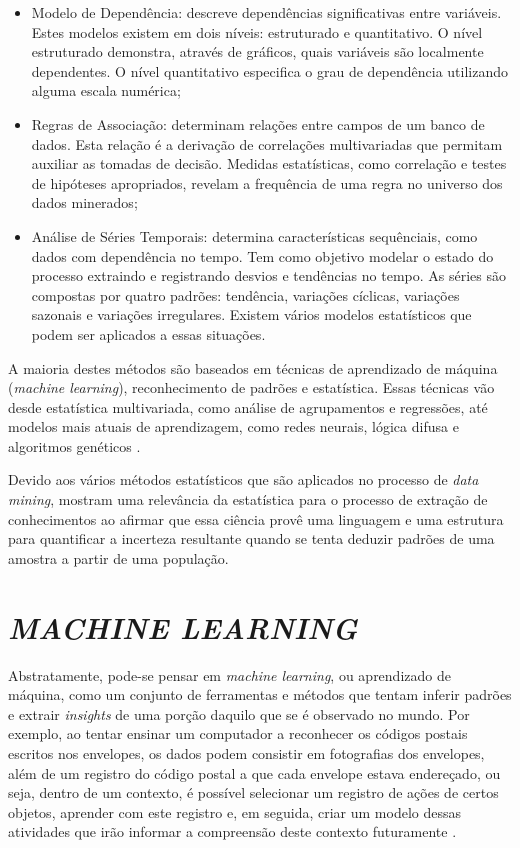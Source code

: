 \begin{itemize}
	\item Modelo de Dependência: descreve dependências significativas entre variáveis. Estes modelos existem em dois níveis: estruturado e quantitativo. O nível estruturado demonstra, através de gráficos, quais variáveis são localmente dependentes. O nível quantitativo especifica o grau de dependência utilizando alguma escala numérica;
	
	\item Regras de Associação: determinam relações entre campos de um banco de dados. Esta relação é a derivação de correlações multivariadas que permitam auxiliar as tomadas de decisão. Medidas estatísticas, como correlação e testes de hipóteses apropriados, revelam a frequência de uma regra no universo dos dados minerados;
	
	\item Análise de Séries Temporais: determina características sequênciais, como dados com dependência no tempo. Tem como objetivo modelar o estado do processo extraindo e registrando desvios e tendências no tempo. As séries são compostas por quatro padrões: tendência, variações cíclicas, variações sazonais e variações irregulares. Existem vários modelos estatísticos que podem ser aplicados a essas situações.
\end{itemize}

A maioria destes métodos são baseados em técnicas de aprendizado de máquina (\textit{machine learning}), reconhecimento de padrões e estatística. Essas técnicas vão desde estatística multivariada, como análise de agrupamentos e regressões, até modelos mais atuais de aprendizagem, como redes neurais, lógica difusa e algoritmos genéticos \cite{conceito-data-mining}.

Devido aos vários métodos estatísticos que são aplicados no processo de \textit{data mining},  mostram uma relevância da estatística para o processo de extração de conhecimentos ao afirmar que essa ciência provê uma linguagem e uma estrutura para quantificar a incerteza resultante quando se tenta deduzir padrões de uma amostra a partir de uma população.

\section{\textit{MACHINE LEARNING}}\label{sec:machine-learning}
Abstratamente, pode-se pensar em \textit{machine learning}, ou aprendizado de máquina, como um conjunto de ferramentas e métodos que tentam inferir padrões e extrair \textit{insights} de uma porção daquilo que se é observado no mundo. Por exemplo, ao tentar ensinar um computador a reconhecer os códigos postais escritos nos envelopes, os dados podem consistir em fotografias dos envelopes, além de um registro do código postal a que cada envelope estava endereçado, ou seja, dentro de um contexto, é possível selecionar um registro de ações de certos objetos, aprender com este registro e, em seguida, criar um modelo dessas atividades que irão informar a compreensão deste contexto futuramente \cite{machine-hacker}.


